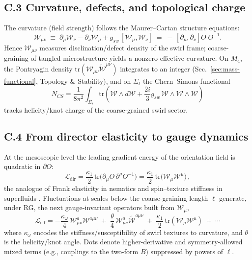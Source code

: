 \documentclass[11pt, preprint,titlepage]{revtex4-2}
\begin{document}
		\subsection*{C.3 Curvature, defects, and topological charge}
		The curvature (field strength) follows the Maurer–Cartan structure equations:
		\[
		\boxed{\quad \mathcal{W}_{\mu\nu} \;\equiv\; \partial_\mu \mathcal{W}_\nu - \partial_\nu \mathcal{W}_\mu
		+ g_{\!sw}\,[\mathcal{W}_\mu,\mathcal{W}_\nu] \;=\; -\,[\partial_\mu,\partial_\nu]O\;O^{-1}. \quad}
		\]
		Hence \(\mathcal{W}_{\mu\nu}\) measures disclination/defect density of the swirl frame; coarse-graining of tangled microstructure yields a nonzero effective curvature.
		On \(M_4\), the Pontryagin density \(\mathrm{tr}(\mathcal{W}_{\mu\nu}\tilde{\mathcal{W}}^{\mu\nu})\) integrates to an integer (Sec.~\ref{sec:mass-functional}, Topology \& Stability), and on \(\Sigma_t\) the Chern–Simons functional
		\[
		N_{\!CS}=\frac{1}{8\pi^2}\int_{\Sigma_t}\mathrm{tr}\!\left(\mathcal{W}\wedge d\mathcal{W}+\frac{2i}{3}g_{\!sw}\,\mathcal{W}\wedge\mathcal{W}\wedge\mathcal{W}\right)
		\]
		tracks helicity/knot charge of the coarse-grained swirl sector.

		\subsection*{C.4 From director elasticity to gauge dynamics}
		At the mesoscopic level the leading gradient energy of the orientation field is quadratic in \(\partial O\):
		\[
		\mathcal{L}_{\text{dir}}=\frac{\kappa_1}{2}\,\mathrm{tr}\big(\partial_\mu O\,\partial^\mu O^{-1}\big)
		= \frac{\kappa_1}{2}\,\mathrm{tr}\big(\mathcal{W}_\mu \mathcal{W}^\mu\big) \,,
		\]
		the analogue of Frank elasticity in nematics and spin–texture stiffness in superfluids \cite{Volovik2009,Lubensky2002,Ho1998}.
		Fluctuations at scales below the coarse-graining length \(\ell\) generate, under RG, the next gauge-invariant operators built from \(\mathcal{W}_\mu\),
		\[
		\boxed{\quad
		\mathcal{L}_{\text{eff}} = -\frac{\kappa_\omega}{4}\,\mathcal{W}_{\mu\nu}^a\mathcal{W}^{a\mu\nu}
		\;+\;\frac{\theta}{4}\,\mathcal{W}_{\mu\nu}^a\tilde{\mathcal{W}}^{a\mu\nu}
		\;+\;\frac{\kappa_1}{2}\,\mathrm{tr}(\mathcal{W}_\mu \mathcal{W}^\mu)\;+\;\cdots \quad}
		\]
		where \(\kappa_\omega\) encodes the stiffness/susceptibility of swirl textures to curvature, and \(\theta\) is the helicity/knot angle. Dots denote higher-derivative and symmetry-allowed mixed terms (e.g., couplings to the two-form \(B\)) suppressed by powers of \(\ell\).
\end{document}
